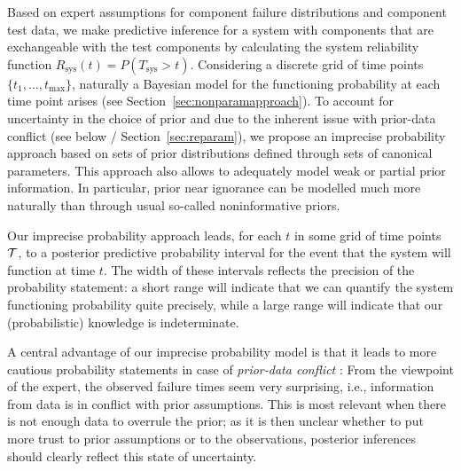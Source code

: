 \documentclass[12pt, a4paper]{elsarticle}
\newcommand{\Rsys}{R_\text{sys}}
\def\Tsys{T_\text{sys}}
\def\tmax{t_\text{max}}
\begin{document}
Based on expert assumptions for component failure distributions and component test data,
we make predictive inference for a system with components that are exchangeable
with the test components by calculating the system reliability function $\Rsys(t) = P(\Tsys > t)$.
Considering a discrete grid of time points $\{t_1, \ldots, \tmax\}$,
naturally a Bayesian model for the functioning probability at each time point arises (see Section~\ref{sec:nonparamapproach}).
To account for uncertainty in the choice of prior
and due to the inherent issue with prior-data conflict (see below / Section~\ref{sec:reparam}),
we propose an imprecise probability approach
based on sets of prior distributions defined through sets of canonical parameters.
This approach also allows to adequately model weak or partial prior information.
In particular, prior near ignorance can be modelled much more naturally than through usual so-called noninformative priors. 

Our imprecise probability approach leads, for each $t$ in some grid of time points ${\cal T}$,
to a posterior predictive probability interval for the event that the system will function at time $t$.
The width of these intervals reflects the precision of the probability statement:
a short range will indicate that we can quantify the system functioning probability quite precisely,
while a large range will indicate that our (probabilistic) knowledge is indeterminate.

A central advantage of our imprecise probability model is
that it leads to more cautious probability statements
in case of \emph{prior-data conflict} \cite[see, e.g.,][]{2006:evans}:
From the viewpoint of the expert, the observed failure times seem very surprising,
i.e., information from data is in conflict with prior assumptions.
This is most relevant when there is not enough data to overrule the prior;
as it is then unclear whether to put more trust to prior assumptions or to the observations,
posterior inferences should clearly reflect this state of uncertainty.
\end{document}
